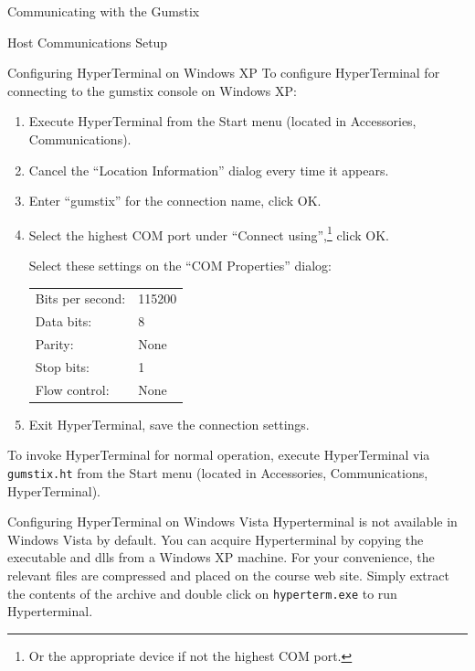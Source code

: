 \documentclass{article}
\begin{document}
\begin{section}{Communicating with the Gumstix}
\begin{subsection}{Host Communications Setup}
			\begin{subsubsection}{Configuring HyperTerminal on Windows XP} \label{hyperterm_xp}
				To configure HyperTerminal for connecting to the gumstix console on Windows
				XP:
				\begin{enumerate}
					\item Execute HyperTerminal from the Start menu (located in Accessories,
					      Communications).
					\item Cancel the ``Location Information'' dialog every time it appears.
					\item Enter ``gumstix'' for the connection name, click OK.
					\item Select the highest COM port under ``Connect using'',\footnote{Or the
					      appropriate device if not the highest COM port.} click OK.

					\begin{item}
						Select these settings on the ``COM Properties'' dialog:
						\begin{center}
							\begin{tabular}{|ll|}
								\hline %
								Bits per second: & 115200 \\
								Data bits:       & 8      \\
								Parity:          & None   \\
								Stop bits:       & 1      \\
								Flow control:    & None   \\
								\hline %
							\end{tabular}
						\end{center}
					\end{item}

					\item Exit HyperTerminal, save the connection settings.
				\end{enumerate}
				To invoke HyperTerminal for normal operation, execute HyperTerminal via
				\texttt{gumstix.ht} from the Start menu (located in Accessories,
				Communications, HyperTerminal).
			\end{subsubsection}

			\begin{subsection}{Configuring HyperTerminal on Windows Vista}
				Hyperterminal is not available in Windows Vista by default.  You can
				acquire Hyperterminal by copying the executable and dlls from a Windows
				XP machine.  For your convenience, the relevant files are compressed
				and placed on the course web site. Simply extract the
				contents of the archive and double click on \texttt{hyperterm.exe} to
				run Hyperterminal.


\end{subsection}
\end{subsection}
\end{section}
\end{document}
